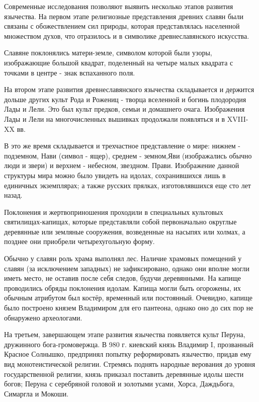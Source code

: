 \documentclass[a4paper, 12pt]{report}
\begin{document}
 Современные исследования позволяют выявить несколько этапов развития язычества.
На первом этапе религиозные представления древних славян были
связаны с обожествлением сил природы, которая представлялась населенной
множеством духов, что отразилось и в символике древнеславянского
искусства. 

Славяне поклонялись матери-земле, символом которой были
узоры, изображающие большой квадрат, поделенный на четыре малых
квадрата с точками в центре - знак вспаханного поля. 

На втором этапе развития древнеславянского язычества складывается
и держится дольше других культ Рода и Рожениц - творца вселенной и
богинь плодородия Лады и Лели. Это был культ предков, семьи и домашнего
очага. Изображения Лады и Лели на многочисленных вышивках продолжали появляться и в XVIII-XX вв.


В это же время складывается и трехчастное представление о мире:
нижнем - подземном, Нави (символ - ящер), среднем - земном,Яви (изображались
обычно люди и звери) и верхнем - небесном, звездном. Прави. Изображение данной
структуры мира можно было увидеть на идолах, сохранившихся лишь в
единичных экземплярах; а также русских прялках, изготовлявшихся еще сто
лет назад.

Поклонения и жертвоприношения проходили в специальных
культовых святилищах-капищах, которые представляли собой
первоначально округлые деревянные или земляные сооружения,
возведенные на насыпях или холмах, а позднее они приобрели
четырехугольную форму.

 Обычно у славян роль храма выполнял лес. Наличие храмовых помещений у славян (за исключением западных) не зафиксировано, однако они вполне могли иметь место, не оставив после себя следов, будучи деревянными. На капище проводились обряды поклонения идолам. Капища могли быть огорожены, их обычным атрибутом был костёр, временный или постоянный. Очевидно, капище было построено князем Владимиром для его пантеона, однако оно до сих пор не обнаружено археологами.

На третьем, завершающем этапе развития язычества появляется культ
Перуна, дружинного бога-громовержца. В 980 г. киевский князь Владимир I,
прозванный Красное Солнышко, предпринял попытку реформировать
язычество, придав ему вид монотеистической религии. Стремясь поднять
народные верования до уровня государственной религии, князь приказал
поставить деревянные идолы шести богов; Перуна с серебряной головой и
золотыми усами, Хорса, Даждьбога, Симаргла и Мокоши. 
\end{document}
